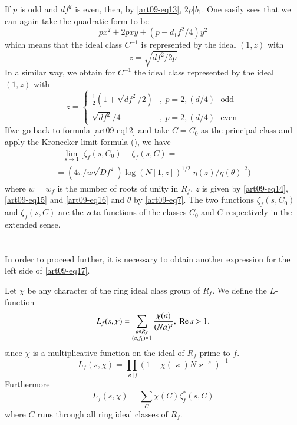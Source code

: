 If $p$ is odd and $df^{2}$ is even, then, by \eqref{art09-eq13}, $2p | b_{1}$. One easily sees that we can again take the quadratic form to be
$$
px^{2}+2pxy+(p-d_{1}f^{2}/4)y^{2}
$$
which means that the ideal class $C^{-1}$ is represented by the ideal $(1,z)$ with 
\begin{equation}
z=\sqrt{df^{2}/2p}\label{art09-eq15}
\end{equation}
In a similar way, we obtain for $C^{-1}$ the ideal class represented by the ideal $(1,z)$ with
\begin{equation}
z=
\begin{cases}
\frac{1}{2}(1+\sqrt{df^{2}}/2) & ,~ p=2, (d/4)\text{~ odd}\\[4pt]
\sqrt{df^{2}}/4 & ,~ p=2, (d/4)\text{~ even}
\end{cases}\label{art09-eq16}
\end{equation}
If\pageoriginale we go back to formula \eqref{art09-eq12} and take $C=C_{0}$ as the principal class and apply the Kronecker limit formula (\cite[formula 6]{art09-key5}), we have
\begin{equation}
\begin{array}{c}
-\lim\limits_{s\to 1} [\zeta_{f}(s,C_{0})-\zeta_{f}(s,C)=\\[3pt]
=(4\pi/w\sqrt{Df^{2}})\log (N[1,z])^{1/2}|\eta(z)/\eta(\theta)|^{2})
\end{array}\label{art09-eq17}
\end{equation}
where $w=w_{f}$ is the number of roots of unity in $R_{f}$, $z$ is given by \eqref{art09-eq14}, \eqref{art09-eq15} and \eqref{art09-eq16} and $\theta$ by \eqref{art09-eq7}. The two functions $\zeta_{f}(s,C_{0})$ and $\zeta_{f}(s,C)$ are the zeta functions of the classes $C_{0}$ and $C$ respectively in the extended sense.

\section{}\label{art09-sec3}
In order to proceed further, it is necessary to obtain another expression for the left side of \eqref{art09-eq17}.

Let $\chi$ be any character of the ring ideal class group of $R_{f}$. We define the $L$-function
\begin{equation}
L_{f}(s,\chi)=\sum\limits_{\substack{a\in R_{f}\\ (a,f_{1})=1}}\frac{\chi(a)}{(Na)^{s}}, \ \operatorname{Re} s>1.\label{art09-eq18}
\end{equation}
since $\chi$ is a multiplicative function on the ideal of $R_{f}$ prime to $f$.
\begin{equation}
L_{f}(s,\chi)=\prod\limits_{\varkappa | f}(1-\chi(\varkappa)N\varkappa^{-s})^{-1}\label{art09-eq19}
\end{equation}
Furthermore
\begin{equation}
L_{f}(s,\chi)=\sum\limits_{C}\chi(C)\zeta^{*}_{f}(s,C)\label{art09-eq20}
\end{equation}
where $C$ runs through all ring ideal classes of $R_{f}$.

